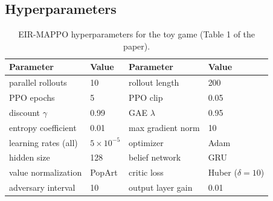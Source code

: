 \documentclass[11pt]{article}
\begin{document}
\subsection{Hyperparameters}

\begin{table}[h]
  \centering
  \begin{tabular}{@{}llll@{}}
    \toprule
    Parameter & Value & Parameter & Value \\
    \midrule
    parallel rollouts & 10 & rollout length & 200 \\
    PPO epochs & 5 & PPO clip & 0.05 \\
    discount $\gamma$ & 0.99 & GAE $\lambda$ & 0.95 \\
    entropy coefficient & 0.01 & max gradient norm & 10 \\
    learning rates (all) & $5\times10^{-5}$ & optimizer & Adam \\
    hidden size & 128 & belief network & GRU \\
    value normalization & PopArt & critic loss & Huber ($\delta = 10$) \\
    adversary interval & 10 & output layer gain & 0.01 \\
    \bottomrule
  \end{tabular}
  \caption{EIR-MAPPO hyperparameters for the toy game (Table 1 of the paper).}
\end{table}
\end{document}
